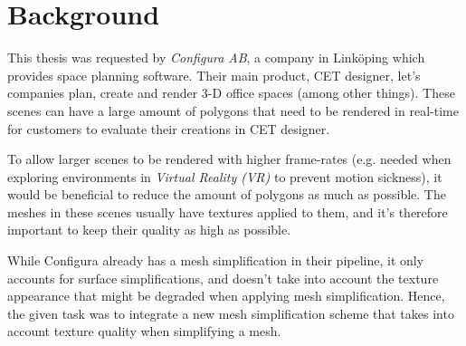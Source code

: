 \section{Background}
\label{sec:background}

This thesis was requested by \emph{Configura AB}, a company in Linköping which provides space planning software. Their main product, CET designer, let's companies plan, create and render 3-D office spaces (among other things). These scenes can have a large amount of polygons that need to be rendered in real-time for customers to evaluate their creations in CET designer.

To allow larger scenes to be rendered with higher frame-rates (e.g. needed when exploring environments in \emph{Virtual Reality (VR)} to prevent motion sickness), it would be beneficial to reduce the amount of polygons as much as possible. The meshes in these scenes usually have textures applied to them, and it's therefore important to keep their quality as high as possible.

While Configura already has a mesh simplification in their pipeline, it only accounts for surface simplifications, and doesn't take into account the texture appearance that might be degraded when applying mesh simplification. Hence, the given task was to integrate a new mesh simplification scheme that takes into account texture quality when simplifying a mesh.



